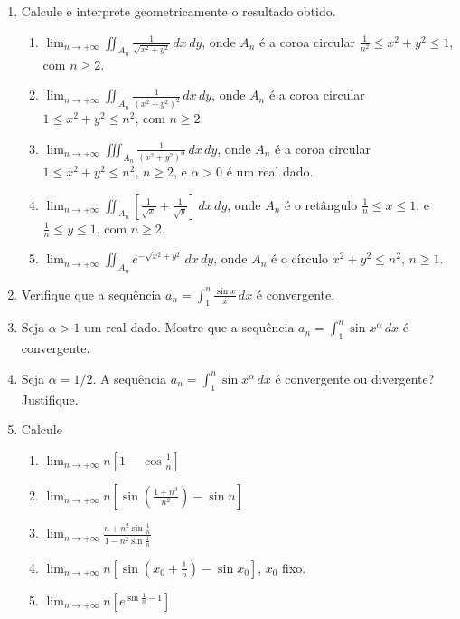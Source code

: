 \documentclass[11pt,a4paper]{article}
\newcommand{\limite}{\displaystyle\lim}
\newcommand{\integral}{\displaystyle\int}
\begin{document}
\begin{enumerate}
		\item Calcule e interprete geometricamente o resultado obtido.
		\begin{enumerate}
			\item $\limite_{n \to +\infty} \displaystyle\iint_{A_n} \displaystyle\frac{1}{\sqrt{x^2 + y^2}} \,dx\,dy$, onde $A_n$ é a coroa circular $\displaystyle\frac{1}{n^2} \leq x^2 + y^2 \leq 1 $, com $n \geq 2$.
			\item $\limite_{n \to +\infty} \displaystyle\iint_{A_n} \displaystyle\frac{1}{(x^2 + y^2)^2} \,dx\,dy$, onde $A_n$ é a coroa circular $1 \leq x^2 + y^2 \leq n^2 $, com $n \geq 2$.
			\item $\limite_{n \to +\infty} \displaystyle\iiint_{A_n} \displaystyle\frac{1}{(x^2 + y^2)^\alpha} \,dx\,dy$, onde $A_n$ é a coroa circular $1 \leq x^2 + y^2 \leq n^2 $, $n \geq 2$, e $\alpha > 0$ é um real dado.
			\item $\limite_{n \to +\infty} \displaystyle\iint_{A_n} \displaystyle\left[\frac{1}{\sqrt{x}} + \frac{1}{\sqrt{y}}\right]\,dx\,dy$, onde $A_n$ é o retângulo $\displaystyle\frac{1}{n} \leq x \leq 1$, e $\displaystyle\frac{1}{n} \leq y \leq 1$, com $n \geq 2$.
			\item $\limite_{n \to +\infty} \displaystyle\iint_{A_n} e^{-\sqrt{x^2 + y^2}} \,dx\,dy$, onde $A_n$ é o círculo $x^2 + y^2 \leq n^2$, $n \geq 1$.
		\end{enumerate}
		
		\item Verifique que a sequência $a_n = \integral_1^{n} \displaystyle\frac{\sin x}{x} \, dx$ é convergente.
		
		\item Seja $\alpha > 1$ um real dado. Mostre que a sequência $a_n = \integral_1^{n} \sin x^{\alpha} \, dx$ é convergente.
		
		\item Seja $\alpha = 1/2$. A sequência $a_n = \integral_1^{n} \sin x^{\alpha} \, dx$ é convergente ou divergente? Justifique.
		
		\item Calcule
		\begin{enumerate}
			\item $\limite_{n \to +\infty} n\left[1 - \cos \displaystyle \frac{1}{n}\right]$
			\item $\limite_{n \to +\infty} n\left[\sin \left(\displaystyle \frac{1 + n^3}{n^2}\right) - \sin n\right]$
			\item $\limite_{n \to +\infty} \displaystyle \frac{n + n^2 \sin \frac{1}{n}}{1 - n^2 \sin \frac{1}{n}}$
			\item $\limite_{n \to +\infty} n\left[\sin \left(x_0 + \frac{1}{n}\right) - \sin x_0\right]$, $x_0$ fixo.
			\item $\limite_{n \to +\infty} n\left[e^{\sin \frac{1}{n} - 1}\right]$
			

\end{enumerate}
\end{enumerate}
\end{document}
